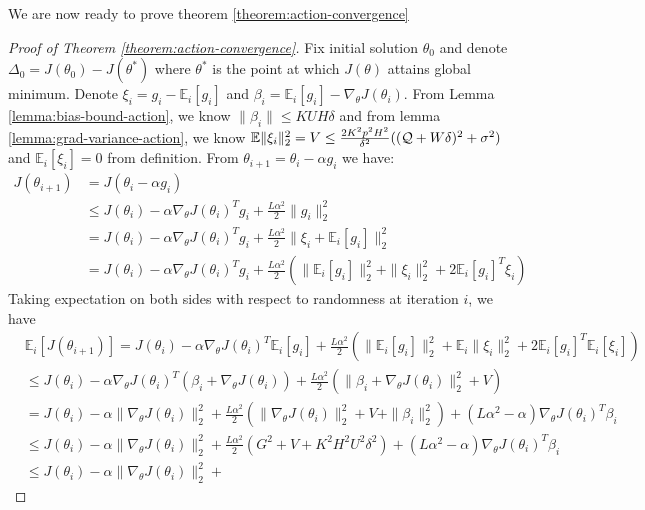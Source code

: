 We are now ready to prove theorem \ref{theorem:action-convergence}
\begin{proof}[Proof of Theorem \ref{theorem:action-convergence}]
  Fix initial solution $\theta_0$ and denote $\Delta_0 =
  J(\theta_0) - J(\theta^*)$ where $\theta^*$ is the point at which
  $J(\theta)$ attains global minimum. Denote $\xi_i = g_i - \mathbb{E}_i[g_i]$ and $\beta_i =
  \mathbb{E}_i[g_i] - \nabla_\theta J(\theta_i)$. From Lemma
  \ref{lemma:bias-bound-action}, we know $\|\beta_i\| \leq KUH\delta$
  and from lemma \ref{lemma:grad-variance-action}, we know
  $\mathbb{E}\|\xi_i\|_2^2 = V \leq \frac{2K^2p^2H^2}{\delta^2} ((\mathcal{Q} +
  W\delta)^2 + \sigma^2)$ and $\mathbb{E}_i[\xi_i] = 0$ from definition. From $\theta_{i+1} = \theta_i - \alpha g_i$
  we have:
  \begin{align*}
    J(\theta_{i+1}) &= J(\theta_i - \alpha g_i) \\
    &\leq J(\theta_i) - \alpha \nabla_\theta J(\theta_i)^Tg_i +
      \frac{L\alpha^2}{2}\|g_i\|_2^2 \\
    &= J(\theta_i) - \alpha \nabla_\theta J(\theta_i)^T g_i +
      \frac{L\alpha^2}{2}\|\xi_i + \mathbb{E}_i[g_i]\|_2^2 \\
                    &= J(\theta_i) - \alpha \nabla_\theta J(\theta_i)^T g_i +
      \frac{L\alpha^2}{2}(\|\mathbb{E}_i[g_i]\|_2^2 + \|\xi_i\|_2^2 + 2\mathbb{E}_i[g_i]^T\xi_i)
  \end{align*}
  Taking expectation on both sides with respect to randomness at
  iteration $i$, we have
  \begin{align*}
    &\mathbb{E}_i[J(\theta_{i+1})] = J(\theta_i) - \alpha\nabla_\theta
    J(\theta_i)^T\mathbb{E}_i[g_i] + \frac{L\alpha^2}{2}(\|\mathbb{E}_i [g_i]\|_2^2 +
    \mathbb{E}_i\|\xi_i\|_2^2 +
      2\mathbb{E}_i[g_i]^T\mathbb{E}_i[\xi_i]) \\
    &\leq J(\theta_i) - \alpha\nabla_\theta J(\theta_i)^T (\beta_i +
      \nabla_\theta J(\theta_i)) +\frac{L\alpha^2}{2}(\|\beta_i + \nabla_\theta
      J(\theta_i)\|_2^2 + V) \\
    &= J(\theta_i) - \alpha\|\nabla_\theta J(\theta_i)\|_2^2 +
      \frac{L\alpha^2}{2}(\|\nabla_\theta J(\theta_i)\|_2^2 + V +
      \|\beta_i\|_2^2) + (L\alpha^2 - \alpha)\nabla_\theta J(\theta_i)^T\beta_i \\
    &\leq J(\theta_i) - \alpha\|\nabla_\theta J(\theta_i)\|_2^2 +
      \frac{L\alpha^2}{2}(G^2 + V + K^2H^2U^2\delta^2) + (L\alpha^2 - \alpha)\nabla_\theta J(\theta_i)^T\beta_i \\
    &\leq J(\theta_i) - \alpha\|\nabla_\theta J(\theta_i)\|_2^2 +

\end{align*}
\end{proof}

